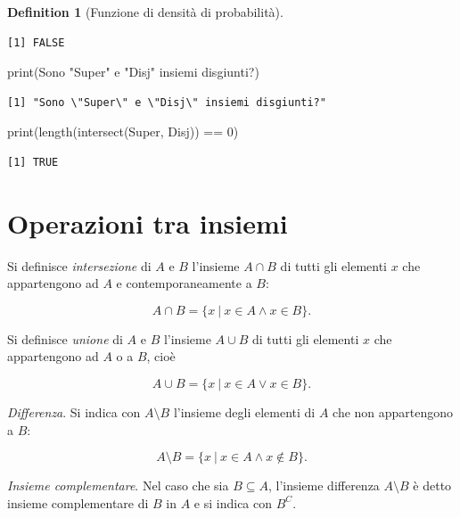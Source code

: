 \documentclass[
  letterpaper,
  DIV=11,
  numbers=noendperiod,
  oneside]{scrreprt}
\newenvironment{Shaded}{\begin{snugshade}}{\end{snugshade}}
\newcommand{\DecValTok}[1]{\textcolor[rgb]{0.68,0.00,0.00}{#1}}
\newcommand{\FunctionTok}[1]{\textcolor[rgb]{0.28,0.35,0.67}{#1}}
\newcommand{\NormalTok}[1]{\textcolor[rgb]{0.00,0.23,0.31}{#1}}
\newcommand{\SpecialCharTok}[1]{\textcolor[rgb]{0.37,0.37,0.37}{#1}}
\newcommand{\StringTok}[1]{\textcolor[rgb]{0.13,0.47,0.30}{#1}}
\theoremstyle{definition}
\theoremstyle{plain}
\theoremstyle{definition}
\newtheorem{definition}{Definition}[chapter]
\theoremstyle{remark}
\begin{document}
\begin{definition}[Funzione di densità di
probabilità]
\begin{verbatim}
[1] FALSE
\end{verbatim}

\begin{Shaded}
\begin{Highlighting}[]
\FunctionTok{print}\NormalTok{(}\StringTok{\textquotesingle{}Sono "Super" e "Disj" insiemi disgiunti?\textquotesingle{}}\NormalTok{)}
\end{Highlighting}
\end{Shaded}

\begin{verbatim}
[1] "Sono \"Super\" e \"Disj\" insiemi disgiunti?"
\end{verbatim}

\begin{Shaded}
\begin{Highlighting}[]
\FunctionTok{print}\NormalTok{(}\FunctionTok{length}\NormalTok{(}\FunctionTok{intersect}\NormalTok{(Super, Disj)) }\SpecialCharTok{==} \DecValTok{0}\NormalTok{)}
\end{Highlighting}
\end{Shaded}

\begin{verbatim}
[1] TRUE
\end{verbatim}

\section{Operazioni tra insiemi}\label{operazioni-tra-insiemi}

Si definisce \emph{intersezione} di \(A\) e \(B\) l'insieme \(A \cap B\)
di tutti gli elementi \(x\) che appartengono ad \(A\) e
contemporaneamente a \(B\):

\[
A \cap B = \{x ~\vert~ x \in A \land x \in B\}.
\]

Si definisce \emph{unione} di \(A\) e \(B\) l'insieme \(A \cup B\) di
tutti gli elementi \(x\) che appartengono ad \(A\) o a \(B\), cioè

\[
A \cup B = \{x ~\vert~ x \in A \lor x \in B\}.
\]

\emph{Differenza}. Si indica con \(A \setminus B\) l'insieme degli
elementi di \(A\) che non appartengono a \(B\):

\[
A \setminus B = \{x ~\vert~ x \in A \land x \notin B\}.
\]

\emph{Insieme complementare}. Nel caso che sia \(B \subseteq A\),
l'insieme differenza \(A \setminus B\) è detto insieme complementare di
\(B\) in \(A\) e si indica con \(B^C\).


\end{definition}
\end{document}
